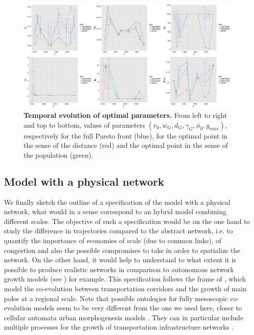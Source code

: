 \documentclass[11pt]{article}
\begin{document}
\begin{figure}
	\includegraphics[width=\linewidth]{figures/6-2-3-fig-macrocoevol-parameters.jpg}
	\caption[Evolution of calibrated parameters]{\textbf{Temporal evolution of optimal parameters.} From left to right and top to bottom, values of parameters $(r_0,w_G,d_G,\gamma_G,\phi_0,g_{max})$, respectively for the full Pareto front (blue), for the optimal point in the sense of the distance (red) and the optimal point in the sense of the population (green). \label{fig:macrocoevol:parameters}}
\end{figure}


\subsection{Model with a physical network}


We finally sketch the outline of a specification of the model with a physical network, what would in a sense correspond to an hybrid model combining different scales. The objective of such a specification would be on the one hand to study the difference in trajectories compared to the abstract network, i.e. to quantify the importance of economies of scale (due to common links), of congestion and also the possible compromises to take in order to spatialize the network. On the other hand, it would help to understand to what extent it is possible to produce realistic networks in comparison to autonomous network growth models (see \cite{xie2009modeling}) for example. This specification follows the frame of \cite{li2014modeling}, which model the co-evolution between transportation corridors and the growth of main poles at a regional scale. Note that possible ontologies for fully mesoscopic co-evolution models seem to be very different from the one we used here, closer to cellular automata urban morphogenesis models \citep{2018arXiv180505195R}. They can in particular include multiple processes for the growth of transportation infrastructure networks \citep{raimbault2018multi}.
\end{document}
